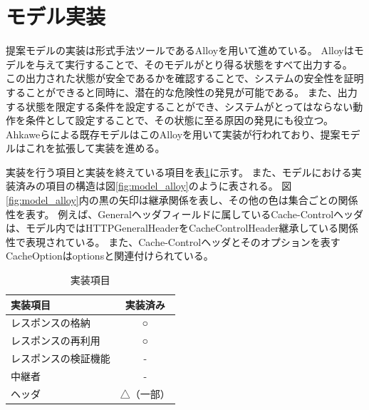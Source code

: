 \documentclass{css}
\begin{document}
\section{モデル実装}
提案モデルの実装は形式手法ツールであるAlloyを用いて進めている。
Alloyはモデルを与えて実行することで、そのモデルがとり得る状態をすべて出力する。
この出力された状態が安全であるかを確認することで、システムの安全性を証明することができると同時に、潜在的な危険性の発見が可能である。
また、出力する状態を限定する条件を設定することができ、システムがとってはならない動作を条件として設定することで、その状態に至る原因の発見にも役立つ。
Ahkaweらによる既存モデル\cite{webmodel}はこのAlloyを用いて実装が行われており、提案モデルはこれを拡張して実装を進める。



実装を行う項目と実装を終えている項目を表\ref{tb:model_implement}に示す。
また、モデルにおける実装済みの項目の構造は図\ref{fig:model_alloy}のように表される。
図\ref{fig:model_alloy}内の黒の矢印は継承関係を表し、その他の色は集合ごとの関係性を表す。
例えば、Generalヘッダフィールドに属しているCache-Controlヘッダは、モデル内ではHTTPGeneralHeaderをCacheControlHeader継承している関係性で表現されている。
また、Cache-Controlヘッダとそのオプションを表すCacheOptionはoptionsと関連付けられている。


\begin{table}[htb]
\centering
\caption{実装項目}
\label{tb:model_implement}
\begin{tabular}{l|c}
実装項目 & 実装済み \\ \hline
レスポンスの格納 & ○ \\
レスポンスの再利用 & ○ \\
レスポンスの検証機能 & - \\
中継者 & - \\
ヘッダ & △（一部） \\
\end{tabular}
\end{table}
\end{document}
